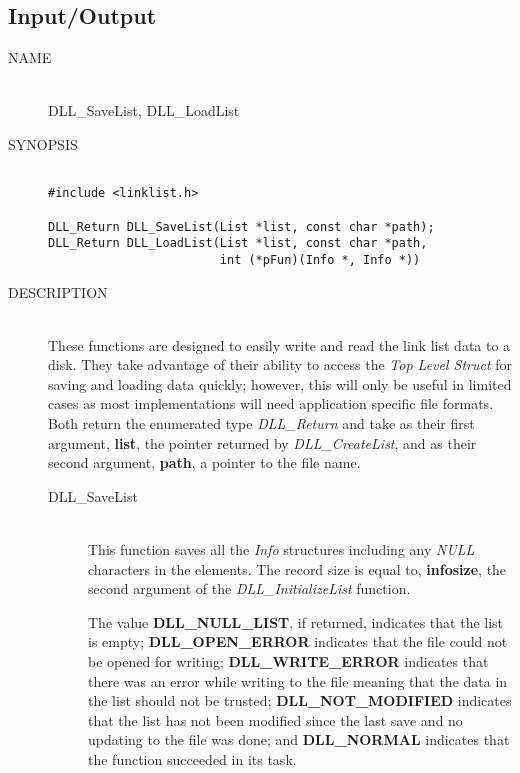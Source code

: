 \documentclass[10pt,letterpaper,titlepage]{article}
\begin{document}
\newpage

\subsection{Input/Output}
\begin{description}
\item[NAME]\quad\\
DLL\_SaveList, DLL\_LoadList

\item[SYNOPSIS]
\begin{verbatim}

#include <linklist.h>

DLL_Return DLL_SaveList(List *list, const char *path);
DLL_Return DLL_LoadList(List *list, const char *path,
                        int (*pFun)(Info *, Info *))
\end{verbatim}

\item[DESCRIPTION]\quad\\
These functions are designed to easily write and read the link list data to a disk.  They take advantage of their ability to access the \emph{Top Level Struct} for saving and loading data quickly; however, this will only be useful in limited cases as most implementations will need application specific file formats.  Both return the enumerated type \emph{DLL\_Return} and take as their first argument, \textbf{list}, the pointer returned by \emph{DLL\_CreateList}, and as their second argument, \textbf{path}, a pointer to the file name.

\begin{description}
\item[DLL\_SaveList]\quad\\
 This function saves all the \emph{Info} structures including any \emph{NULL} characters in the elements.  The record size is equal to, \textbf{infosize}, the second argument of the \emph{DLL\_InitializeList} function.
\vspace{8pt}

\noindent
  The value \textbf{DLL\_NULL\_LIST}, if returned, indicates that the list is empty; \textbf{DLL\_OPEN\_ERROR} indicates that the file could not be opened for writing; \textbf{DLL\_WRITE\_ERROR} indicates that there was an error while writing to the file meaning that the data in the list should not be trusted; \textbf{DLL\_NOT\_MODIFIED} indicates that the list has not been modified since the last save and no updating to the file was done; and \textbf{DLL\_NORMAL} indicates that the function succeeded in its task.


\end{description}
\end{description}
\end{document}
